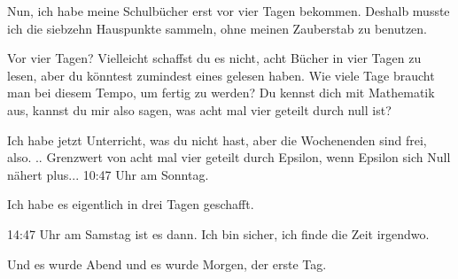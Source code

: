 \glqq{}Nun, ich habe meine Schulbücher erst vor vier Tagen bekommen. Deshalb
musste ich die siebzehn Hauspunkte sammeln, ohne meinen Zauberstab zu
benutzen.\grqq{}

\glqq{}Vor vier Tagen? Vielleicht schaffst du es nicht, acht Bücher in vier Tagen
zu lesen, aber du könntest zumindest eines gelesen haben. Wie viele Tage braucht
man bei diesem Tempo, um fertig zu werden? Du kennst dich mit Mathematik aus,
kannst du mir also sagen, was acht mal vier geteilt durch null ist?\grqq{}

\glqq{}Ich habe jetzt Unterricht, was du nicht hast, aber die Wochenenden sind
frei, also. .. Grenzwert von acht mal vier geteilt durch Epsilon, wenn Epsilon
sich Null nähert plus... 10:47 Uhr am Sonntag.\grqq{}

\glqq{}Ich habe es eigentlich in drei Tagen geschafft.\grqq{}

\glqq{}14:47 Uhr am Samstag ist es dann. Ich bin sicher, ich finde die Zeit
irgendwo.\grqq{}

Und es wurde Abend und es wurde Morgen, der erste Tag.